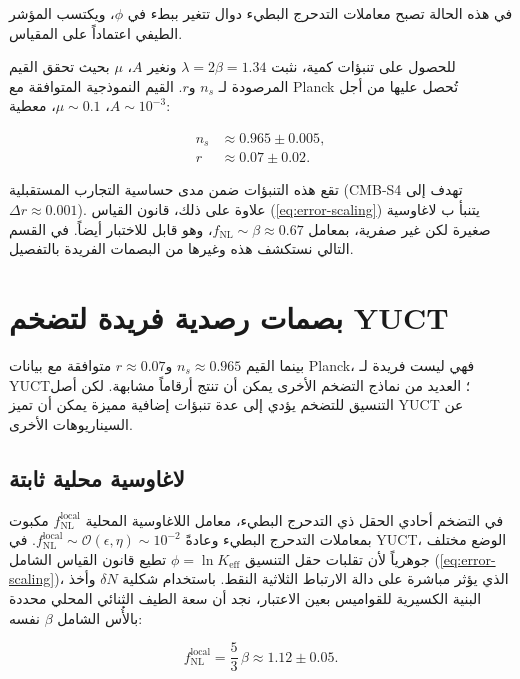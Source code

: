 \documentclass[12pt,a4paper]{article}
\newcommand{\Keff}{K_{\mathrm{eff}}}
\newcommand{\rs}{r}
\begin{document}
	في هذه الحالة تصبح معاملات التدحرج البطيء دوال تتغير ببطء في \(\phi\)، ويكتسب المؤشر الطيفي اعتماداً على المقياس.
	
	للحصول على تنبؤات كمية، نثبت \(\lambda = 2\beta = 1.34\) ونغير \(A\)، \(\mu\) بحيث تحقق القيم المرصودة لـ \(n_s\) و\(\rs\). القيم النموذجية المتوافقة مع Planck تُحصل عليها من أجل \(A \sim 10^{-3}\)، \(\mu \sim 0.1\)، معطية:
	
	\begin{align}
		n_s &\approx 0.965 \pm 0.005, \\
		\rs &\approx 0.07 \pm 0.02.
	\end{align}
	
	تقع هذه التنبؤات ضمن مدى حساسية التجارب المستقبلية (CMB‑S4 تهدف إلى \(\Delta r \approx 0.001\)). علاوة على ذلك، قانون القياس (\ref{eq:error-scaling}) يتنبأ ب لاغاوسية صغيرة لكن غير صفرية، بمعامل \(f_{\mathrm{NL}} \sim \beta \approx 0.67\)، وهو قابل للاختبار أيضاً. في القسم التالي نستكشف هذه وغيرها من البصمات الفريدة بالتفصيل.
	
	\section{بصمات رصدية فريدة لتضخم YUCT}
	\label{sec:signatures}
	
	بينما القيم \(n_s \approx 0.965\) و\(r \approx 0.07\) متوافقة مع بيانات Planck، فهي ليست فريدة لـ YUCT؛ العديد من نماذج التضخم الأخرى يمكن أن تنتج أرقاماً مشابهة. لكن أصل التنسيق للتضخم يؤدي إلى عدة تنبؤات إضافية مميزة يمكن أن تميز YUCT عن السيناريوهات الأخرى.
	
	\subsection{لاغاوسية محلية ثابتة}
	
	في التضخم أحادي الحقل ذي التدحرج البطيء، معامل اللاغاوسية المحلية \(f_{\text{NL}}^{\text{local}}\) مكبوت بمعاملات التدحرج البطيء وعادةً \(f_{\text{NL}}^{\text{local}} \sim \mathcal{O}(\epsilon, \eta) \sim 10^{-2}\). في YUCT، الوضع مختلف جوهرياً لأن تقلبات حقل التنسيق \(\phi = \ln \Keff\) تطيع قانون القياس الشامل (\ref{eq:error-scaling})، الذي يؤثر مباشرة على دالة الارتباط الثلاثية النقط. باستخدام شكلية \(\delta N\) وأخذ البنية الكسيرية للقواميس بعين الاعتبار، نجد أن سعة الطيف الثنائي المحلي محددة بالأُس الشامل \(\beta\) نفسه:
	
	\begin{equation}
		f_{\text{NL}}^{\text{local}} = \frac{5}{3}\,\beta \approx 1.12 \pm 0.05.
		\label{eq:fnl}
	\end{equation}
	
\end{document}
